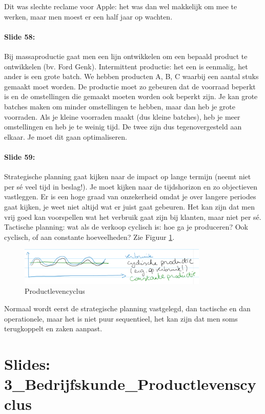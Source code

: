 \documentclass[10pt,a4paper]{report}
\begin{document}
Dit was slechte reclame voor Apple: het was dan wel makkelijk om mee te werken, maar men moest er een half jaar op wachten.

\paragraph{Slide 58:} Bij massaproductie gaat men een lijn ontwikkelen om een bepaald product te ontwikkelen (bv. Ford Genk). Intermittent productie: het een is eenmalig, het ander is een grote batch. We hebben producten A, B, C waarbij een aantal stuks gemaakt moet worden. De productie moet zo gebeuren dat de voorraad beperkt is en de omstellingen die gemaakt moeten worden ook beperkt zijn. Je kan grote batches maken om minder omstellingen te hebben, maar dan heb je grote voorraden. Als je kleine voorraden maakt (dus kleine batches), heb je meer omstellingen en heb je te weinig tijd. De twee zijn dus tegenovergesteld aan elkaar. Je moet dit gaan optimaliseren.

\paragraph{Slide 59:} Strategische planning gaat kijken naar de impact op lange termijn (neemt niet per s\'e veel tijd in beslag!). Je moet kijken naar de tijdshorizon en zo objectieven vastleggen. Er is een hoge graad van onzekerheid omdat je over langere periodes gaat kijken, je weet niet altijd wat er juist gaat gebeuren. Het kan zijn dat men vrij goed kan voorspellen wat het verbruik gaat zijn bij klanten, maar niet per s\'e.\\
Tactische planning: wat als de verkoop cyclisch is: hoe ga je produceren? Ook cyclisch, of aan constante hoeveelheden? Zie Figuur \ref{les02_02}.


\begin{figure}[h!]
\centering
\includegraphics[width=90mm]{Les02_02.png}
\caption{Productlevencyclus} 
\label{les02_02}
\end{figure}


Normaal wordt eerst de strategische planning vastgelegd, dan tactische en dan operationele, maar het is niet puur sequentieel, het kan zijn dat men soms terugkoppelt en zaken aanpast.

\section{Slides: 3\_Bedrijfskunde\_Productlevenscyclus}
\end{document}
